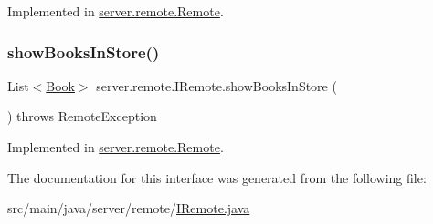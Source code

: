 Implemented in \hyperlink{classserver_1_1remote_1_1_remote_ad3a381123e93a8e5ec26d84c4ff8b92f}{server.\+remote.\+Remote}.

\mbox{\label{interfaceserver_1_1remote_1_1_i_remote_ac8a764235c51eff20d635f40707e377e}} 
\subsubsection{\texorpdfstring{show\+Books\+In\+Store()}{showBooksInStore()}}
{\footnotesize\ttfamily List$<$\hyperlink{classserver_1_1data_1_1_book}{Book}$>$ server.\+remote.\+I\+Remote.\+show\+Books\+In\+Store (\begin{DoxyParamCaption}{ }\end{DoxyParamCaption}) throws Remote\+Exception}



Implemented in \hyperlink{classserver_1_1remote_1_1_remote_a131873c01bc4fe829dd7d2385c89ca87}{server.\+remote.\+Remote}.



The documentation for this interface was generated from the following file\+:\begin{DoxyCompactItemize}
\item 
src/main/java/server/remote/\hyperlink{_i_remote_8java}{I\+Remote.\+java}\end{DoxyCompactItemize}
